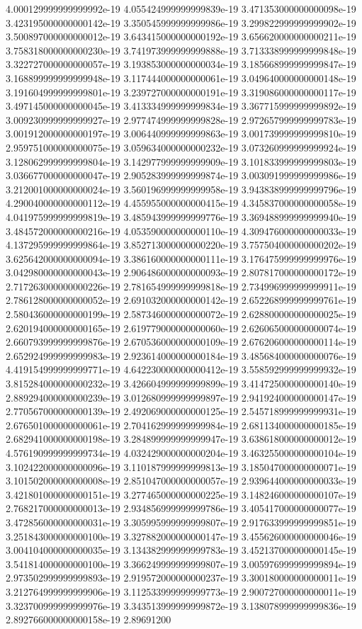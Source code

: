 	4.000129999999999992e-19	4.055424999999999839e-19	3.471353000000000098e-19	3.423195000000000142e-19	3.350545999999999986e-19	3.299822999999999902e-19	3.500897000000000012e-19	3.643415000000000192e-19	3.656620000000000211e-19	3.758318000000000230e-19	3.741973999999999888e-19	3.713338999999999848e-19	3.322727000000000057e-19	3.193853000000000034e-19	3.185668999999999847e-19	3.168899999999999948e-19	3.117444000000000061e-19	3.049640000000000148e-19	3.191604999999999801e-19	3.239727000000000191e-19	3.319086000000000117e-19	3.497145000000000045e-19	3.413334999999999834e-19	3.367715999999999892e-19	3.009230999999999927e-19	2.977474999999999828e-19	2.972657999999999783e-19	3.001912000000000197e-19	3.006440999999999863e-19	3.001739999999999810e-19	2.959751000000000075e-19	3.059634000000000232e-19	3.073260999999999924e-19	3.128062999999999804e-19	3.142977999999999909e-19	3.101833999999999803e-19	3.036677000000000047e-19	2.905283999999999874e-19	3.003091999999999986e-19	3.212001000000000024e-19	3.560196999999999958e-19	3.943838999999999796e-19	4.290040000000000112e-19	4.455955000000000415e-19	4.345837000000000058e-19	4.041975999999999819e-19	3.485943999999999776e-19	3.369488999999999940e-19	3.484572000000000216e-19	4.053590000000000110e-19	4.309476000000000033e-19	4.137295999999999864e-19	3.852713000000000220e-19	3.757504000000000202e-19	3.625642000000000094e-19	3.386160000000000111e-19	3.176475999999999976e-19	3.042980000000000043e-19	2.906486000000000093e-19	2.807817000000000172e-19	2.717263000000000226e-19	2.781654999999999818e-19	2.734996999999999911e-19	2.786128000000000052e-19	2.691032000000000142e-19	2.652268999999999761e-19	2.580436000000000199e-19	2.587346000000000072e-19	2.628800000000000025e-19	2.620194000000000165e-19	2.619779000000000060e-19	2.626065000000000074e-19	2.660793999999999876e-19	2.670536000000000109e-19	2.676206000000000114e-19	2.652924999999999983e-19	2.923614000000000184e-19	3.485684000000000076e-19	4.419154999999999771e-19	4.642230000000000412e-19	3.558592999999999932e-19	3.815284000000000232e-19	3.426604999999999899e-19	3.414725000000000140e-19	2.889294000000000239e-19	3.012680999999999897e-19	2.941924000000000147e-19	2.770567000000000139e-19	2.492069000000000125e-19	2.545718999999999931e-19	2.676501000000000061e-19	2.704162999999999984e-19	2.681134000000000185e-19	2.682941000000000198e-19	3.284899999999999947e-19	3.638618000000000012e-19	4.576190999999999734e-19	4.032429000000000204e-19	3.463255000000000104e-19	3.102422000000000096e-19	3.110187999999999813e-19	3.185047000000000071e-19	3.101502000000000008e-19	2.851047000000000057e-19	2.939644000000000033e-19	3.421801000000000151e-19	3.277465000000000225e-19	3.148246000000000107e-19	2.768217000000000013e-19	2.934856999999999786e-19	3.405417000000000077e-19	3.472856000000000031e-19	3.305995999999999807e-19	2.917633999999999851e-19	3.251843000000000100e-19	3.327882000000000147e-19	3.455626000000000046e-19	3.004104000000000035e-19	3.134382999999999783e-19	3.452137000000000145e-19	3.541814000000000100e-19	3.366249999999999807e-19	3.005976999999999894e-19	2.973502999999999893e-19	2.919572000000000237e-19	3.300180000000000011e-19	3.212764999999999906e-19	3.112533999999999773e-19	2.900727000000000011e-19	3.323700999999999976e-19	3.343513999999999872e-19	3.138078999999999836e-19	2.892766000000000158e-19	2.89691200